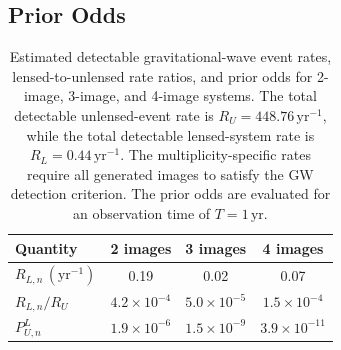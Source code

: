 \documentclass[linenumbers,amsmath,trackchanges]{aastex702}
\begin{document}
\subsection{Prior Odds}
\begin{table}[h!]
    \centering
    \caption{
    Estimated detectable gravitational-wave event rates,
    lensed-to-unlensed rate ratios, and prior odds for
    2-image, 3-image, and 4-image systems.
    The total detectable unlensed-event rate is
    $R_U=448.76\,\mathrm{yr}^{-1}$, while the total
    detectable lensed-system rate is
    $R_L=0.44\,\mathrm{yr}^{-1}$.
    The multiplicity-specific rates require all generated
    images to satisfy the GW detection criterion.
    The prior odds are evaluated for an observation time
    of $T=1\,\mathrm{yr}$.
    }
    \begin{tabular}{lccc}
        \hline
        Quantity & 2 images & 3 images & 4 images \\
        \hline
        $R_{L,n}\,(\mathrm{yr}^{-1})$
        & 0.19 & 0.02 & 0.07 \\

        $R_{L,n}/R_U$
        & $4.2\times10^{-4}$
        & $5.0\times10^{-5}$
        & $1.5\times10^{-4}$ \\

        $P_{U,n}^{L}$
        & $1.9\times10^{-6}$
        & $1.5\times10^{-9}$
        & $3.9\times10^{-11}$ \\
        \hline
    \end{tabular}
    \label{tab:prior_odds}
\end{table}
\end{document}
